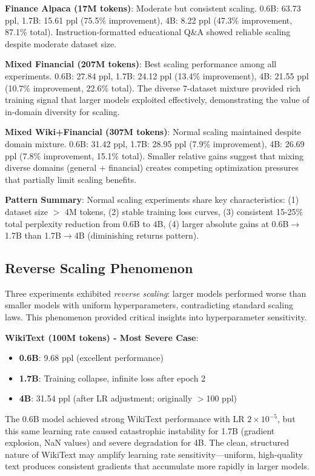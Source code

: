 \textbf{Finance Alpaca (17M tokens)}: Moderate but consistent scaling. 0.6B: 63.73 ppl, 1.7B: 15.61 ppl (75.5\% improvement), 4B: 8.22 ppl (47.3\% improvement, 87.1\% total). Instruction-formatted educational Q\&A showed reliable scaling despite moderate dataset size.

\textbf{Mixed Financial (207M tokens)}: Best scaling performance among all experiments. 0.6B: 27.84 ppl, 1.7B: 24.12 ppl (13.4\% improvement), 4B: 21.55 ppl (10.7\% improvement, 22.6\% total). The diverse 7-dataset mixture provided rich training signal that larger models exploited effectively, demonstrating the value of in-domain diversity for scaling.

\textbf{Mixed Wiki+Financial (307M tokens)}: Normal scaling maintained despite domain mixture. 0.6B: 31.42 ppl, 1.7B: 28.95 ppl (7.9\% improvement), 4B: 26.69 ppl (7.8\% improvement, 15.1\% total). Smaller relative gains suggest that mixing diverse domains (general + financial) creates competing optimization pressures that partially limit scaling benefits.

\textbf{Pattern Summary}: Normal scaling experiments share key characteristics: (1) dataset size $>$ 4M tokens, (2) stable training loss curves, (3) consistent 15-25\% total perplexity reduction from 0.6B to 4B, (4) larger absolute gains at 0.6B$\to$1.7B than 1.7B$\to$4B (diminishing returns pattern).

\subsection{Reverse Scaling Phenomenon}

Three experiments exhibited \textit{reverse scaling}: larger models performed worse than smaller models with uniform hyperparameters, contradicting standard scaling laws. This phenomenon provided critical insights into hyperparameter sensitivity.

\textbf{WikiText (100M tokens) - Most Severe Case}:
\begin{itemize}
\item \textbf{0.6B}: 9.68 ppl (excellent performance)
\item \textbf{1.7B}: Training collapse, infinite loss after epoch 2
\item \textbf{4B}: 31.54 ppl (after LR adjustment; originally $>$100 ppl)
\end{itemize}

The 0.6B model achieved strong WikiText performance with LR $2 \times 10^{-5}$, but this same learning rate caused catastrophic instability for 1.7B (gradient explosion, NaN values) and severe degradation for 4B. The clean, structured nature of WikiText may amplify learning rate sensitivity---uniform, high-quality text produces consistent gradients that accumulate more rapidly in larger models.


